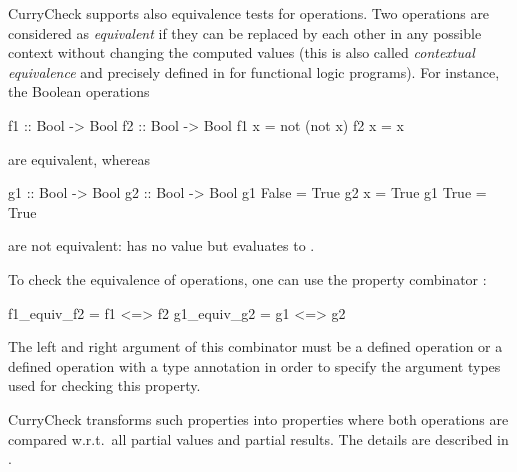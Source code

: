 CurryCheck supports also equivalence tests for operations.
Two operations are considered as \emph{equivalent} if they
can be replaced by each other in any possible context
without changing the computed values (this is also called
\emph{contextual equivalence} and precisely defined in
\cite{AntoyHanus12PADL} for functional logic programs).
For instance, the Boolean operations
\begin{curry}
f1 :: Bool -> Bool               f2 :: Bool -> Bool
f1 x = not (not x)                f2 x = x
\end{curry}
are equivalent, whereas
\begin{curry}
g1 :: Bool -> Bool               g2 :: Bool -> Bool
g1 False = True                   g2 x = True
g1 True  = True
\end{curry}
are not equivalent:  has no value but
 evaluates to .

To check the equivalence of operations, one can use the
property combinator \code{<=>}:
\begin{curry}
f1_equiv_f2 = f1 <=> f2
g1_equiv_g2 = g1 <=> g2
\end{curry}
The left and right argument of this combinator must be a defined operation
or a defined operation with a type annotation in order to specify
the argument types used for checking this property.

CurryCheck transforms such properties into properties
where both operations are compared w.r.t.\ all partial
values and partial results.
The details are described in \cite{AntoyHanus18FLOPS}.

